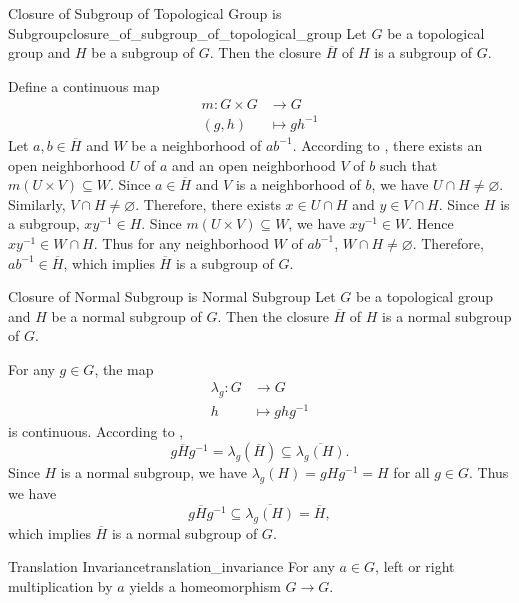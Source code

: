\documentclass{report}
\begin{document}
\begin{proposition}{Closure of Subgroup of Topological Group is Subgroup}{closure_of_subgroup_of_topological_group}
	Let $G$ be a topological group and $H$ be a subgroup of $G$. Then the closure $\overline{H}$ of $H$ is a subgroup of $G$.
\end{proposition}
\begin{prf}
	 Define a continuous map 
	\begin{align*}
		m:G\times G & \longrightarrow G \\
		(g,h)         & \longmapsto gh^{-1}
	\end{align*}
	Let $a,b\in \overline{H}$ and $W$ be a neighborhood of $ab^{-1}$. According to , there exists an open neighborhood $U$ of $a$ and an open neighborhood $V$ of $b$ such that $m(U\times V)\subseteq W$. Since $a \in \overline{H}$ and $V$ is a neighborhood of $b$, we have $U\cap H\ne \varnothing$. Similarly, $V\cap H\ne \varnothing$. Therefore, there exists $x\in U \cap H$ and $y\in V\cap H$. Since $H$ is a subgroup, $xy^{-1}\in H$. Since $m(U\times V)\subseteq W$, we have $xy^{-1}\in W$. Hence $xy^{-1}\in W\cap H$.
	Thus for any neighborhood $W$ of $ab^{-1}$, $W\cap H\ne \varnothing$. Therefore, $ab^{-1}\in \overline{H}$, which implies $\overline{H}$ is a subgroup of $G$.
\end{prf}

\begin{proposition}{Closure of Normal Subgroup is Normal Subgroup}{}
	Let $G$ be a topological group and $H$ be a normal subgroup of $G$. Then the closure $\overline{H}$ of $H$ is a normal subgroup of $G$.
\end{proposition}
\begin{prf}
	For any $g\in G$, the map
	\begin{align*}
		\lambda_g:G & \longrightarrow G \\
		h         & \longmapsto ghg^{-1}
	\end{align*}
	is continuous. According to , 
	\[
		g \overline{H} g^{-1}=\lambda_g(\overline{H})\subseteq \overline{\lambda_g(H)}.
	\]
	Since $H$ is a normal subgroup, we have $\lambda_g(H)=gHg^{-1}=H$ for all $g\in G$.  Thus we have
	\[
	g \overline{H} g^{-1}\subseteq \overline{\lambda_g(H)}= \overline{H},
	\]
	which implies $\overline{H}$ is a normal subgroup of $G$.
\end{prf}



\begin{proposition}{Translation Invariance}{translation_invariance}
	For any $a \in G$, left or right multiplication by $a$ yields a homeomorphism $G \rightarrow G$.
\end{proposition}
\end{document}
